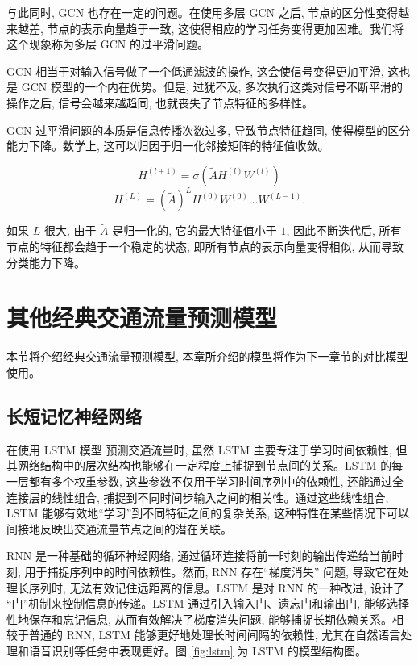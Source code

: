 与此同时, GCN 也存在一定的问题。在使用多层 GCN 之后, 节点的区分性变得越来越差, 节点的表示向量趋于一致, 这使得相应的学习任务变得更加困难。我们将 这个现象称为多层 GCN 的过平滑问题。

GCN 相当于对输入信号做了一个低通滤波的操作, 这会使信号变得更加平滑, 这也是 GCN 模型的一个内在优势。但是, 过犹不及, 多次执行这类对信号不断平滑的操作之后, 信号会越来越趋同, 也就丧失了节点特征的多样性。

GCN 过平滑问题的本质是信息传播次数过多, 导致节点特征趋同, 使得模型的区分能力下降。数学上, 这可以归因于归一化邻接矩阵的特征值收敛。

\begin{equation}
{{H}}^{\left( {l} + 1\right) } = \sigma \left( {\widetilde{{A}}{{H}}^{\left( {l}\right) }{{W}}^{\left( {l}\right) }}\right)
\end{equation}
\begin{equation}
{{H}}^{\left( {L}\right) } = {\left( \widetilde{{A}}\right) }^{{L}}{{H}}^{\left( 0\right) }{{W}}^{\left( 0\right) }\ldots {{W}}^{\left( {L} - 1\right) }.
\end{equation}

如果 \({L}\) 很大, 由于 \(\widetilde{{A}}\) 是归一化的, 它的最大特征值小于 $1$, 因此不断迭代后, 所有节点的特征都会趋于一个稳定的状态, 即所有节点的表示向量变得相似, 从而导致分类能力下降。



\section{其他经典交通流量预测模型}
本节将介绍经典交通流量预测模型, 本章所介绍的模型将作为下一章节的对比模型使用。

\subsection{长短记忆神经网络}

在使用 LSTM 模型 \parencite{2016_Greff_LSTM_A_search_space_odyssey} 预测交通流量时, 虽然 LSTM 主要专注于学习时间依赖性, 但其网络结构中的层次结构也能够在一定程度上捕捉到节点间的关系。LSTM 的每一层都有多个权重参数, 这些参数不仅用于学习时间序列中的依赖性, 还能通过全连接层的线性组合, 捕捉到不同时间步输入之间的相关性。通过这些线性组合, LSTM 能够有效地“学习”到不同特征之间的复杂关系, 这种特性在某些情况下可以间接地反映出交通流量节点之间的潜在关联。

RNN 是一种基础的循环神经网络, 通过循环连接将前一时刻的输出传递给当前时刻, 用于捕捉序列中的时间依赖性。然而, RNN 存在“梯度消失” 问题, 导致它在处理长序列时, 无法有效记住远距离的信息。LSTM 是对 RNN 的一种改进, 设计了 “门”机制来控制信息的传递。LSTM 通过引入输入门、遗忘门和输出门, 能够选择性地保存和忘记信息, 从而有效解决了梯度消失问题, 能够捕捉长期依赖关系。相较于普通的 RNN, LSTM 能够更好地处理长时间间隔的依赖性, 尤其在自然语言处理和语音识别等任务中表现更好。图 \ref{fig:lstm} 为 LSTM 的模型结构图。


